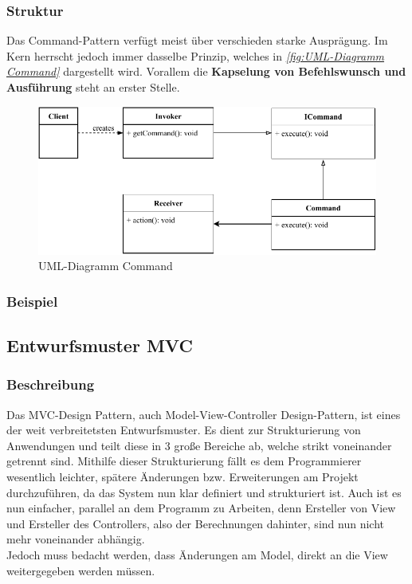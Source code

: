 \subsubsection{Struktur}
Das Command-Pattern verfügt meist über verschieden starke Ausprägung.
Im Kern herrscht jedoch immer dasselbe Prinzip, welches in \textit{\autoref{fig:UML-Diagramm Command}} dargestellt wird.
Vorallem die \textbf{Kapselung von Befehlswunsch und Ausführung} steht an erster Stelle.
\begin{figure}[htb!]
    \centering
    \includegraphics[width=1\textwidth]{fig/ainf/Command.pdf}
    \caption{UML-Diagramm Command}
    \label{fig:UML-Diagramm Command}
\end{figure}
\subsubsection{Beispiel}
\subsection{Entwurfsmuster MVC}\label{subsec:entwurfsmuster-mvc}
\subsubsection{Beschreibung}
Das MVC-Design Pattern, auch Model-View-Controller Design-Pattern, ist eines der weit verbreitetsten Entwurfsmuster.
Es dient zur Strukturierung von Anwendungen und teilt diese in 3 große Bereiche ab, welche strikt voneinander getrennt sind.
Mithilfe dieser Strukturierung fällt es dem Programmierer wesentlich leichter, spätere Änderungen bzw. Erweiterungen am Projekt durchzuführen, da das System nun klar definiert und strukturiert ist.
Auch ist es nun einfacher, parallel an dem Programm zu Arbeiten, denn Ersteller von View und Ersteller des Controllers, also der Berechnungen dahinter, sind nun nicht mehr voneinander abhängig.\\
Jedoch muss bedacht werden, dass Änderungen am Model, direkt an die View weitergegeben werden müssen.
